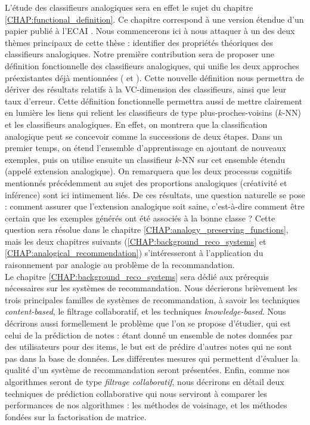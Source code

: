L'étude des classifieurs analogiques sera en effet le sujet du chapitre
\ref{CHAP:functional_definition}. Ce chapitre correspond à une version étendue
d'un papier publié à l'ECAI \cite{HugPraRicSerECAI16}. Nous commencerons ici à
nous attaquer à un des deux thèmes principaux de cette thèse : identifier des
propriétés théoriques des classifieurs analogiques. Notre première contribution
sera de proposer une définition fonctionnelle des classifieurs analogiques, qui
unifie les deux approches préexistantes déjà mentionnées (\cite{StrYvoCNLL05}
et \cite{BayMicDelIJCAI07}). Cette nouvelle définition nous permettra de
dériver des résultats relatifs à la VC-dimension des classifieurs, ainsi que
leur taux d'erreur. Cette définition fonctionnelle permettra aussi de mettre
clairement en lumière les liens qui relient les classifieurs de type
plus-proches-voisins ($k$-NN) et les classifieurs analogiques. En effet, on
montrera que la classification analogique peut se concevoir comme la
successions de deux étapes. Dans un premier temps, on étend l'ensemble
d'apprentissage  en ajoutant de nouveaux exemples, puis on utilise ensuite un
classifieur $k$-NN sur cet ensemble étendu (appelé extension analogique). On
remarquera que les deux processus cognitifs mentionnés précédemment au
sujet des proportions analogiques (créativité et inférence) sont ici intimement
liés. De ces résultats, une question naturelle se pose : comment assurer que
l'extension analogique soit saine, c'est-à-dire comment être certain que les
exemples générés ont été associés à la bonne classe ? Cette question sera
résolue dans le chapitre \ref{CHAP:analogy_preserving_functions}, mais les deux
chapitres suivants (\ref{CHAP:background_reco_systems} et
\ref{CHAP:analogical_recommendation}) s'intéresseront à l'application du
raisonnement par analogie au problème de la recommandation.\\


Le chapitre  \ref{CHAP:background_reco_systems} sera dédié aux prérequis
nécessaires sur les systèmes de recommandation. Nous décrierons brièvement les
trois principales familles de systèmes de recommandation, à savoir les
techniques \textit{content-based}, le filtrage collaboratif, et les techniques
\textit{knowledge-based}. Nous décrirons aussi formellement le problème que
l'on se propose d'étudier, qui est celui de la prédiction de notes : étant
donné un ensemble de notes données par des utilisateurs pour des items, le but
est de prédire d'autres notes qui ne sont pas dans la base de données. Les
différentes mesures qui permettent d'évaluer la qualité d'un système de
recommandation seront présentées. Enfin, comme nos algorithmes seront de type
\textit{filtrage collaboratif}, nous décrirons en détail deux techniques de
prédiction collaborative qui nous serviront à comparer les performances de nos
algorithmes : les méthodes de voisinage, et les méthodes fondées sur la
factorisation de matrice.\\


